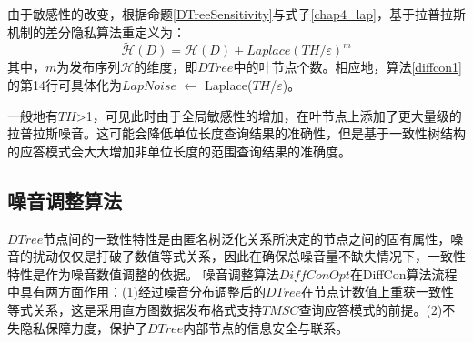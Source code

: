 由于敏感性的改变，根据命题\ref{DTreeSensitivity}与式子\ref{chap4_lap}，基于拉普拉斯机制的差分隐私算法重定义为：
\begin{equation}
\label{chap4_dtree}
\widetilde{\mathcal{H}}(D) = \mathcal{H}(D) + \textit{Laplace}(TH/\varepsilon)^m
\end{equation}
其中，$m$为发布序列$\mathcal{H}$的维度，即$DTree$中的叶节点个数。相应地，算法\ref{diffcon1}的第14行可具体化为$LapNoise$ $\leftarrow$ Laplace($TH$/$\varepsilon$)。

一般地有$TH$>1，可见此时由于全局敏感性的增加，在叶节点上添加了更大量级的拉普拉斯噪音。这可能会降低单位长度查询结果的准确性，但是基于一致性树结构的应答模式会大大增加非单位长度的范围查询结果的准确度。








\subsection{噪音调整算法}

$DTree$节点间的一致性特性是由匿名树泛化关系所决定的节点之间的固有属性，噪音的扰动仅仅是打破了数值等式关系，因此在确保总噪音量不缺失情况下，一致性特性是作为噪音数值调整的依据。
噪音调整算法$DiffConOpt$在DiffCon算法流程中具有两方面作用：(1)经过噪音分布调整后的$DTree$在节点计数值上重获一致性等式关系，这是采用直方图数据发布格式支持$TMSC$查询应答模式的前提。(2)不失隐私保障力度，保护了$DTree$内部节点的信息安全与联系。

